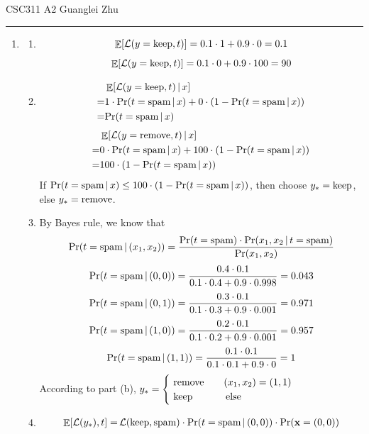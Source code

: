 \documentclass[12pt]{article}
\DeclareMathOperator{\E}{\mathbb{E}}
\begin{document}
  CSC311 A2
  \hfill
  Guanglei Zhu
  \smallskip
  \hrule
  \bigskip
  \begin{enumerate}
    \item \begin{enumerate}
    \item $$\E[\mathcal{L}(y=\tx{keep}, t)] = 0.1 \cdot 1 + 0.9 \cdot 0 = 0.1$$
    $$\E[\mathcal{L}(y=\tx{keep}, t)] = 0.1 \cdot 0 + 0.9 \cdot 100 = 90$$
    \item \begin{align*}
    &\E[\mathcal{L}(y=\tx{keep}, t) \, | \, x]   \\
    =& 1 \cdot \tx{Pr}(t = \tx{spam}\, |\, x) + 0 \cdot (1 - \tx{Pr}(t = \tx{spam}\, |\, x)) \\
    =& \tx{Pr}(t = \tx{spam}\, |\, x)
    \end{align*}
    \begin{align*}
    &\E[\mathcal{L}(y=\tx{remove}, t) \, | \, x]   \\
    =& 0 \cdot \tx{Pr}(t = \tx{spam}\, |\, x) + 100 \cdot (1 - \tx{Pr}(t = \tx{spam}\, |\, x)) \\
    =& 100 \cdot (1 - \tx{Pr}(t = \tx{spam}\, |\, x))
    \end{align*}
    If $\text{{Pr}}(t = \text{{spam}}\, |\, x) \leq 100 \cdot (1 - \text{{Pr}}(t = \text{{spam}}\, |\, x))$, then choose $y_* = \text{{keep}}$, else $y_* = \text{{remove}}$.
    \item
    By Bayes rule, we know that $$\text{{Pr}}(t = \text{{spam}}\, |\, (x_1, x_2)) = \frac{\text{{Pr}}(t = \text{{spam}}) \cdot \text{{Pr}}(x_1, x_2 \, | \, t = \text{{spam}})}{\text{{Pr}}(x_1, x_2)}$$
    $$\text{{Pr}}(t = \text{{spam}}\, |\, (0, 0)) = \frac{0.4 \cdot 0.1}{0.1 \cdot 0.4 + 0.9 \cdot 0.998} = 0.043$$
    $$\text{{Pr}}(t = \text{{spam}}\, |\, (0, 1)) = \frac{0.3 \cdot 0.1}{0.1 \cdot 0.3 + 0.9 \cdot 0.001} = 0.971$$
    $$\text{{Pr}}(t = \text{{spam}}\, |\, (1, 0)) = \frac{0.2 \cdot 0.1}{0.1 \cdot 0.2 + 0.9 \cdot 0.001} = 0.957$$
    $$\text{{Pr}}(t = \text{{spam}}\, |\, (1, 1)) = \frac{0.1 \cdot 0.1}{0.1 \cdot 0.1 + 0.9 \cdot 0} = 1$$
    According to part (b), $y_* =
    \begin{cases} \text{{ remove}} \qquad (x_1, x_2) = (1, 1)\\ \text{{ keep}} \qquad \quad \text{{ else}}
    \end{cases}$
    \item \begin{align*}
      \E[\mathcal{L}(y_*), t] =& \, \mathcal{L}(\tx{keep}, \tx{spam}) \cdot
      \tx{Pr}(t = \tx{spam}\, |\, (0, 0)) \cdot \tx{Pr}(\textbf x = (0, 0)) \\

\end{align*}
\end{enumerate}
\end{enumerate}
\end{document}
